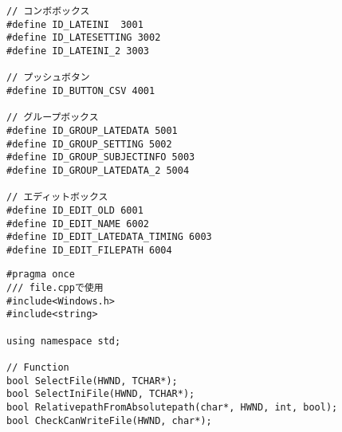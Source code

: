 \begin{lstlisting}[caption=window.h]
// コンボボックス
#define ID_LATEINI  3001
#define ID_LATESETTING 3002
#define ID_LATEINI_2 3003

// プッシュボタン
#define ID_BUTTON_CSV 4001

// グループボックス
#define ID_GROUP_LATEDATA 5001
#define ID_GROUP_SETTING 5002
#define ID_GROUP_SUBJECTINFO 5003
#define ID_GROUP_LATEDATA_2 5004

// エディットボックス
#define ID_EDIT_OLD 6001
#define ID_EDIT_NAME 6002
#define ID_EDIT_LATEDATA_TIMING 6003
#define ID_EDIT_FILEPATH 6004
\end{lstlisting}

\begin{lstlisting}[caption=file.h]
#pragma once
/// file.cppで使用
#include<Windows.h>
#include<string>

using namespace std;

// Function
bool SelectFile(HWND, TCHAR*);
bool SelectIniFile(HWND, TCHAR*);
bool RelativepathFromAbsolutepath(char*, HWND, int, bool);
bool CheckCanWriteFile(HWND, char*);
\end{lstlisting}


